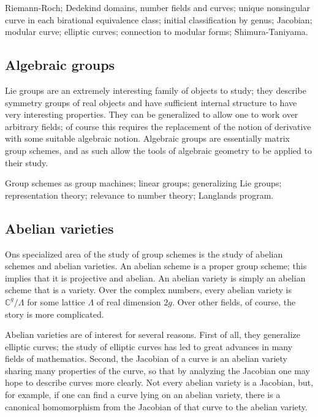 \documentclass[12pt]{article}
\begin{document}
Riemann-Roch;  Dedekind domains, number fields and curves; unique nonsingular curve in each birational equivalence class; initial classification by genus; Jacobian; modular curve; elliptic curves; connection to modular forms; Shimura-Taniyama.

\subsection*{Algebraic groups}

Lie groups are an extremely interesting family of objects to study; they describe symmetry groups of real objects and have sufficient internal structure to have very interesting properties.  They can be generalized to allow one to work over arbitrary fields; of course this requires the replacement of the notion of derivative with some suitable algebraic notion.  Algebraic groups are essentially matrix group schemes, and as such allow the tools of algebraic geometry to be applied to their study.

Group schemes as group machines; linear groups; generalizing Lie groups; representation theory; relevance to number theory; Langlands program.

\subsection*{Abelian varieties}

Ons specialized area of the study of group schemes is the study of abelian schemes and abelian varieties.  An abelian scheme is a proper group scheme; this implies that it is projective and abelian.  An abelian variety is simply an abelian scheme that is a variety.  Over the complex numbers, every abelian variety is $\mathbb{C}^g/\Lambda$ for some lattice $\Lambda$ of real dimension $2g$.  Over other fields, of course, the story is more complicated.

Abelian varieties are of interest for several reasons.  First of all, they generalize elliptic curves; the study of elliptic curves has led to great advances in many fields of mathematics.  Second, the Jacobian of a curve is an abelian variety sharing many properties of the curve, so that by analyzing the Jacobian one may hope to describe curves more clearly.  Not every abelian variety is a Jacobian, but, for example, if one can find a curve lying on an abelian variety, there is a canonical homomorphism from the Jacobian of that curve to the abelian variety. 
\end{document}
